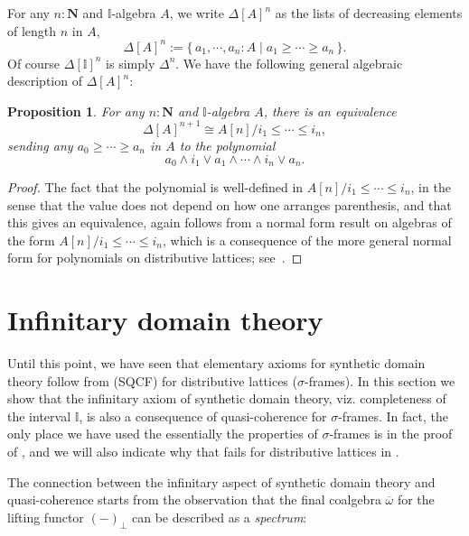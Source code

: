 \documentclass[12pt]{amsart}
\newtheorem{proposition}[theorem]{Proposition}
\theoremstyle{definition}
\newcommand{\mb}[1]{\mathbf{#1}}
\newcommand{\mbb}[1]{\mathbb{#1}}
\newcommand{\I}{\mbb I}
\newcommand{\ov}[1]{\overline{#1}}
\newcommand{\scomp}[2]{\{\,#1\mid#2\,\}}
\newcommand{\N}{\mb N}
\newcommand{\prt}{_{\bot}}
\begin{document}
For any $n : \N$ and $\I$-algebra $A$, we write $\Delta[A]^{n}$ as the lists of decreasing elements of length $n$ in $A$,
\[ \Delta[A]^{n} := \scomp{a_1,\cdots,a_n : A}{a_1 \ge \cdots \ge a_n}. \]
Of course $\Delta[\I]^n$ is simply $\Delta^n$. We have the following general algebraic description of $\Delta[A]^n$:

\begin{proposition}\label{prop:simplicesasalgebra}
  For any $n : \N$ and $\I$-algebra $A$, there is an equivalence 
  \[ \Delta[A]^{n+1} \cong A[n]/i_1 \le \cdots \le i_n, \]
  sending any $a_0 \ge \cdots \ge a_n$ in $A$ to the polynomial 
  \[ a_0 \wedge i_1 \vee a_1 \wedge \cdots \wedge i_n \vee a_n. \]
\end{proposition}
\begin{proof}
  The fact that the polynomial is well-defined in $A[n]/i_1 \le \cdots \le i_n$, in the sense that the value does not depend on how one arranges parenthesis, and that this gives an equivalence, again follows from a normal form result on algebras of the form $A[n]/i_1 \le \cdots \le i_n$, which is a consequence of the more general normal form for polynomials on distributive lattices; see~\cite[Thm. 10.21]{lausch2000algebra}.
\end{proof}

\section{Infinitary domain theory}\label{sec:infdomain}

Until this point, we have seen that elementary axioms for synthetic domain theory follow from (SQCF) for distributive lattices ($\sigma$-frames). In this section we show that the infinitary axiom of synthetic domain theory, viz. completeness of the interval $\I$, is also a consequence of quasi-coherence for $\sigma$-frames. In fact, the only place we have used the essentially the properties of $\sigma$-frames is in the proof of , and we will also indicate why that fails for distributive lattices in .

The connection between the infinitary aspect of synthetic domain theory and quasi-coherence starts from the observation that the final coalgebra $\ov\omega$ for the lifting functor $(-)\prt$ can be described as a \emph{spectrum}:
\end{document}
